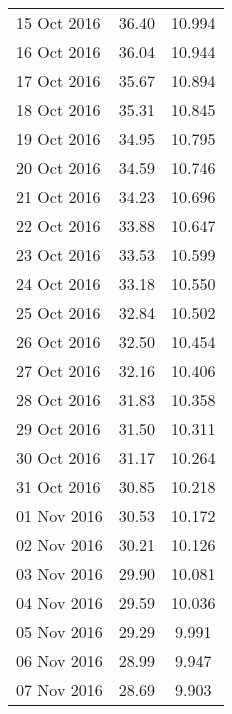 \documentclass[11pt,a4paper,twoside]{article}
\begin{document}
\begin{longtable}{lcc}
15 Oct 2016                    & 36.40                & 10.994     \\
16 Oct 2016                    & 36.04                & 10.944     \\
17 Oct 2016                    & 35.67                & 10.894     \\
18 Oct 2016                    & 35.31                & 10.845     \\
19 Oct 2016                    & 34.95                & 10.795     \\
20 Oct 2016                    & 34.59                & 10.746     \\
21 Oct 2016                    & 34.23                & 10.696     \\
22 Oct 2016                    & 33.88                & 10.647     \\
23 Oct 2016                    & 33.53                & 10.599     \\
24 Oct 2016                    & 33.18                & 10.550     \\
25 Oct 2016                    & 32.84                & 10.502     \\
26 Oct 2016                    & 32.50                & 10.454     \\
27 Oct 2016                    & 32.16                & 10.406     \\
28 Oct 2016                    & 31.83                & 10.358     \\
29 Oct 2016                    & 31.50                & 10.311     \\
30 Oct 2016                    & 31.17                & 10.264     \\
31 Oct 2016                    & 30.85                & 10.218     \\
01 Nov 2016                    & 30.53                & 10.172     \\
02 Nov 2016                    & 30.21                & 10.126     \\
03 Nov 2016                    & 29.90                & 10.081     \\
04 Nov 2016                    & 29.59                & 10.036     \\
05 Nov 2016                    & 29.29                & 9.991      \\
06 Nov 2016                    & 28.99                & 9.947      \\
07 Nov 2016                    & 28.69                & 9.903      \\

\end{longtable}
\end{document}

